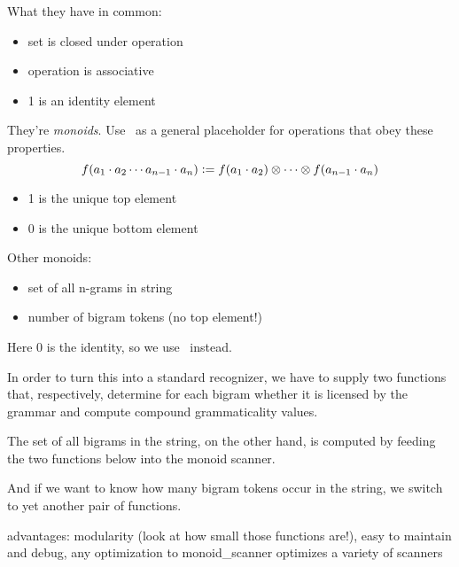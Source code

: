 What they have in common:
%
\begin{itemize}
    \item set is closed under operation
    \item operation is associative
    \item 1 is an identity element
\end{itemize}
%
They're \emph{monoids}.
Use \semimult\ as a general placeholder for operations that obey these properties.
%
\[
    f(a_1 \cdot a_2 \cdots a_{n-1} \cdot a_n) \mathrel{\mathop:}=
        f(a_1 \cdot a_2) \otimes \cdots \otimes f(a_{n-1} \cdot a_n)
\]
%
\begin{itemize}
    \item 1 is the unique top element
    \item 0 is the unique bottom element
\end{itemize}
%
Other monoids:
%
\begin{itemize}
    \item set of all n-grams in string
    \item number of bigram tokens (no top element!)
\end{itemize}
%
Here 0 is the identity, so we use \semiadd\ instead.

\begin{center}
\end{center}
%
In order to turn this into a standard recognizer, we have to supply two functions that, respectively, determine for each bigram whether it is licensed by the grammar and compute compound grammaticality values.
%
\begin{center}
\end{center}
%
The set of all bigrams in the string, on the other hand, is computed by feeding the two functions below into the monoid scanner.
%
\begin{center}
\end{center}
%
And if we want to know how many bigram tokens occur in the string, we switch to yet another pair of functions.
%
\begin{center}
\end{center}

advantages: modularity (look at how small those functions are!), easy to maintain and debug, any optimization to monoid_scanner optimizes a variety of scanners

\begin{center}
\end{center}

